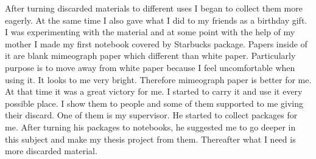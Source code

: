 After turning discarded materials to different uses I began to collect them more eagerly. At the same time I also gave what I did to my friends as a birthday gift. I was experimenting with the material and at some point with the help of my mother I made my first notebook covered by Starbucks package. Papers inside of it are blank mimeograph paper which different than white paper. Particularly purpose is to move away from white paper because I feel uncomfortable when using it. It looks to me very bright. Therefore mimeograph paper is better for me. At that time it was a great victory for me. I started to carry it and use it every possible place. I show them to people and some of them supported to me giving their discard. One of them is my supervisor. He started to collect packages for me. After turning his packages to notebooks, he suggested me to go deeper in this subject and make my thesis project from them. Thereafter what I need is more discarded material.




